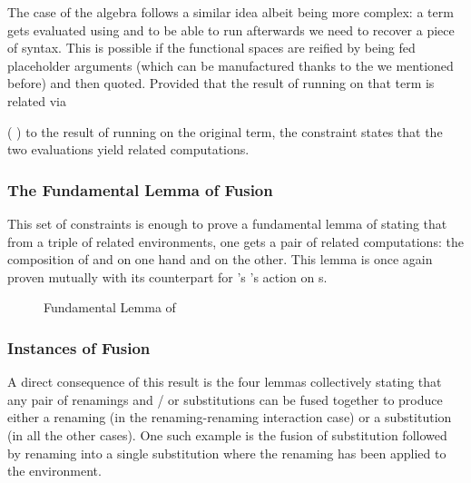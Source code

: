 \begin{agdasnippet}
\addtolength{\leftskip}{\parindent}
\end{agdasnippet}
The case of the algebra follows a similar idea albeit being more complex:
a term gets evaluated using  and to be able to run 
afterwards we need to recover a piece of syntax. This is possible if the
 functional spaces are reified by being fed placeholder  arguments
(which can be manufactured thanks to the  we mentioned before) and
then quoted. Provided that the result of running  on that term is
related via {   (  ) to the result
of running  on the original term, the  constraint states
that the two evaluations yield related computations.

\begin{agdasnippet}
\addtolength{\leftskip}{\parindent}
\end{agdasnippet}

\subsubsection{The Fundamental Lemma of Fusion}

This set of constraints is enough to prove a fundamental lemma of 
stating that from a triple of related environments, one gets a pair of related
computations: the composition of  and  on one hand and
 on the other. This lemma is once again proven mutually with its
counterpart for \semrec{}'s 's action on s.

\begin{figure}[h]
\caption{Fundamental Lemma of \label{defn:Fusion}}
\end{figure}

\subsubsection{Instances of Fusion}

A direct consequence of this result is the four lemmas collectively stating
that any pair of renamings and / or substitutions can be fused together to
produce either a renaming (in the renaming-renaming interaction case) or a
substitution (in all the other cases). One such example is the fusion of
substitution followed by renaming into a single substitution where the
renaming has been applied to the environment.

}
